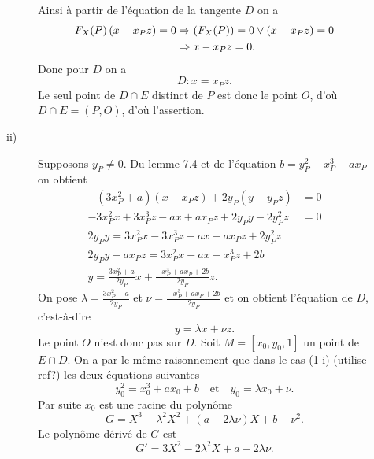 \begin{demonstration}
\begin{description}
\begin{description}
                Ainsi à partir de l'équation de la tangente $D$ on a
                \begin{align*}
                    F_{X}(P)\left( x - x_Pz \right) = 0 &\Rightarrow \left( F_{X}(P) \right) = 0 \vee \left( x - x_Pz \right) = 0 \\
                                                        &\Rightarrow x - x_Pz = 0
                .\end{align*}
                Donc pour $D$ on a 
                \[
                D : x = x_Pz
                .\] 
                Le seul point de $D \cap E$ distinct de $P$ est donc le point $O$, d'où $D \cap E = \left( P,O \right)$, d'où l'assertion.
            \item[ii)] Supposons $y_P \neq 0$. Du lemme 7.4 et de l'équation $b = y_P^2 - x_P^3 - ax_P$ on obtient
                \begin{align*}
                    - \left( 3x_P^2 + a \right) \left( x - x_Pz \right) + 2y_P\left( y - y_Pz \right) &= 0 \\
                    - 3x_P^2x + 3 x_P^3z - ax + ax_Pz + 2y_Py - 2y_P^2z &= 0 \\
                    2y_Py = 3x_P^2x - 3x_P^3z + ax - ax_Pz +2y_P^2z \\
                    2y_Py - ax_Pz = 3x_P^2x + ax - x_P^3z + 2b \\
                    y = \frac{3x_P^2 + a}{2y_P}x + \frac{- x_P^3 + ax_P + 2b}{2y_P}z
                .\end{align*}
                On pose $\lambda = \frac{3x_P^2 + a}{2y_P}$ et $\nu = \frac{- x_P^3 + ax_P + 2b}{2y_P}$ et on obtient l'équation de $D$, c'est-à-dire
                \[
                y = \lambda x + \nu z
                .\] 
                Le point $O$ n'est donc pas sur $D$. Soit $M = \left[ x_0, y_0, 1 \right]$ un point de $E \cap D$. On a par le même raisonnement que dans le cas (1-i) (utilise ref?) les deux équations suivantes
                \[
                y_0^2 = x_0^3 + ax_0 + b \quad \text{et} \quad y_0 = \lambda x_0 + \nu
                .\] 
                Par suite $x_0$ est une racine du polynôme
                \[
                G = X^3 - \lambda^2 X^2 + \left( a - 2\lambda\nu  \right)X + b - \nu^2
                .\] 
                Le polynôme dérivé de $G$ est
                \[
                G' = 3X^2 - 2\lambda^2 X + a - 2\lambda\nu
                .\] 
        \end{description}
    \end{description}
\end{demonstration}
